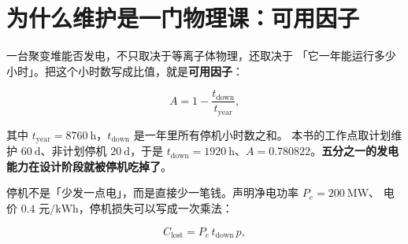 
\section{为什么维护是一门物理课：可用因子}
\label{sec:app-ap-availability}

一台聚变堆能否发电，不只取决于等离子体物理，还取决于
「它一年能运行多少小时」。把这个小时数写成比值，就是\textbf{可用因子}：

\begin{equation}
A = 1 - \frac{t_{\text{down}}}{t_{\text{year}}},
\label{eq:app-ap-avail}
\end{equation}

其中 $t_{\text{year}} = 8760\ \mathrm{h}$，$t_{\text{down}}$ 是一年里所有停机小时数之和。
本书的工作点取计划维护 $60\ \mathrm{d}$、非计划停机 $20\ \mathrm{d}$，于是
$t_{\text{down}} = 1920\ \mathrm{h}$、$A = 0.780822$。\textbf{五分之一的发电能力在设计阶段就被停机吃掉了}。

停机不是「少发一点电」，而是直接少一笔钱。声明净电功率 $P_e = 200\ \mathrm{MW}$、
电价 $0.4$ 元$/\mathrm{kWh}$，停机损失可以写成一次乘法：

\begin{equation}
C_{\text{lost}} = P_e\, t_{\text{down}}\, p,
\label{eq:app-ap-cost}
\end{equation}

